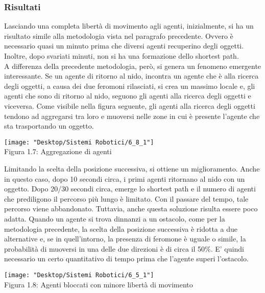 \documentclass[12pt,a4paper,openright,twoside]{report}
\begin{document}
\subsubsection{Risultati}

Lasciando una completa libertà di movimento agli agenti, inizialmente, si ha un risultato simile alla metodologia vista nel paragrafo precedente. Ovvero è necessario quasi un minuto prima che diversi agenti recuperino degli oggetti. Inoltre, dopo svariati minuti, non si ha una formazione dello shortest path.
\\A differenza della precedente metodologia, però, si genera un fenomeno emergente interessante. Se un agente di ritorno al nido, incontra un agente che è alla ricerca degli oggetti, a causa dei due feromoni rilasciati, si crea un massimo locale e, gli agenti che sono di ritorno al nido, seguono gli agenti alla ricerca degli oggetti e viceversa. Come visibile nella figura seguente, gli agenti alla ricerca degli oggetti tendono ad aggregarsi tra loro e muoversi nelle zone in cui è presente l'agente che sta trasportando un oggetto.\\

\begin{center}  
	\texttt{[image: "Desktop/Sistemi Robotici/6\_8\_1"]}
	\\Figura 1.7: Aggregazione di agenti
\end{center}

Limitando la scelta della posizione successiva, si ottiene un miglioramento. Anche in questo caso, dopo 10 secondi circa, i primi agenti ritornano al nido con un oggetto. Dopo 20/30 secondi circa, emerge lo shortest path e il numero di agenti che prediligono il percorso più lungo è limitato. Con il passare del tempo, tale percorso viene abbandonato. Tuttavia, anche questa soluzione risulta essere poco adatta. Quando un agente si trova dinnanzi a un ostacolo, come per la metodologia precedente, la scelta della posizione successiva è ridotta a due alternative e, se in quell'intorno, la presenza di feromone è uguale o simile, la probabilità di muoversi in una delle due direzioni è di circa il 50\%. E' quindi necessario un certo quantitativo di tempo prima che l'agente superi l'ostacolo.\\

\begin{center}  
	\texttt{[image: "Desktop/Sistemi Robotici/6\_5\_1"]}
	\\Figura 1.8: Agenti bloccati con minore libertà di movimento
\end{center}
\end{document}
